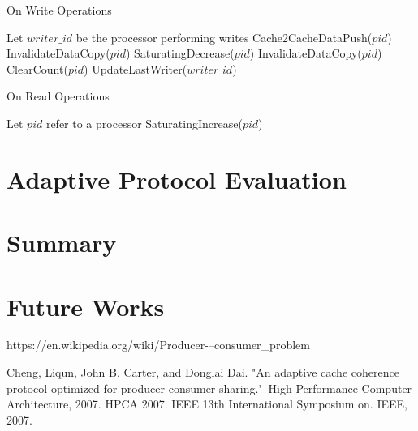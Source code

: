 \documentclass[conference]{IEEEtran}
\begin{document}
\begin{algorithm}
\caption{On Write Operations}
\label{write_operations}
\begin{algorithmic}[1]
\State Let $writer\_id$ be the processor performing writes
     
            \State Cache2CacheDataPush($pid$) 
        \Else
            \State InvalidateDataCopy($pid$) 
        \EndIf
        \State SaturatingDecrease($pid$) 
    \EndFor
\Else
     
        \State InvalidateDataCopy($pid$) 
        \State ClearCount($pid$) 
    \EndFor
    \State UpdateLastWriter($writer\_id$)
\EndIf
\end{algorithmic}
\end{algorithm}

\begin{algorithm}
\caption{On Read Operations}
\label{read_operations}
\begin{algorithmic}[1]
\State Let $pid$ refer to a processor
    \State SaturatingIncrease($pid$) 
\EndFor
\end{algorithmic}
\end{algorithm}



\section{Adaptive Protocol Evaluation}


\section{Summary}


\section{Future Works}


\newpage

\begin{thebibliography}{1}

https://en.wikipedia.org/wiki/Producer-–consumer\_problem

Cheng, Liqun, John B. Carter, and Donglai Dai. "An adaptive cache coherence protocol optimized for producer-consumer sharing." High Performance Computer Architecture, 2007. HPCA 2007. IEEE 13th International Symposium on. IEEE, 2007.

\end{thebibliography}
\end{document}
